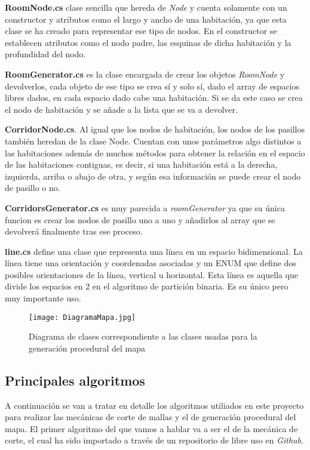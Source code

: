 \textbf{RoomNode.cs} clase sencilla que hereda de \textit{Node} y cuenta solamente con un constructor y atributos como el largo y ancho de una habitación, ya que esta clase se ha creado para representar ese tipo de nodos. En el constructor se establecen atributos como el nodo padre, las esquinas de dicha habitación y la profundidad del nodo.

\textbf{RoomGenerator.cs} es la clase encargada de crear los objetos \textit{RoomNode} y devolverlos, cada objeto de ese tipo se crea sí y solo sí, dado el array de espacios libres dados, en cada espacio dado cabe una habitación. Si se da este caso se crea el nodo de habitación y se añade a la lista que se va a devolver.

\textbf{CorridorNode.cs}. Al igual que los nodos de habitación, los nodos de los pasillos también heredan de la clase Node. Cuentan con unos parámetros algo distintos a las habitaciones además de muchos métodos para obtener la relación en el espacio de las habitaciones contiguas, es decir, si una habitación está a la derecha, izquierda, arriba o abajo de otra, y según esa información se puede crear el nodo de pasillo o no.

\textbf{CorridorsGenerator.cs} es muy parecida a \textit{roomGenerator} ya que su única funcion es crear los nodos de pasillo uno a uno y añadirlos al array que se devolverá finalmente tras ese proceso.

\textbf{line.cs} define una clase que representa una línea en un espacio bidimensional. La línea tiene una orientación y coordenadas asociadas y un ENUM que define dos posibles orientaciones de la línea, vertical u horizontal. Esta línea es aquella que divide los espacios en 2 en el algoritmo de partición binaria. Es su único pero muy importante uso.

\begin{figure}[H]
    \centering
    \texttt{[image: DiagramaMapa.jpg]}
    \caption{Diagrama de clases correspondiente a las clases usadas para la generación procedural del mapa}
\end{figure}

\subsection{Principales algoritmos}

A continuación se van a tratar en detalle los algoritmos utiliados en este proyecto para realizar las mecánicas de corte de mallas y el de generación procedural del mapa. El primer algoritmo del que vamos a hablar va a ser el de la mecánica de corte, el cual ha sido importado a través de un repositorio de libre uso en \textit{Github}. 

